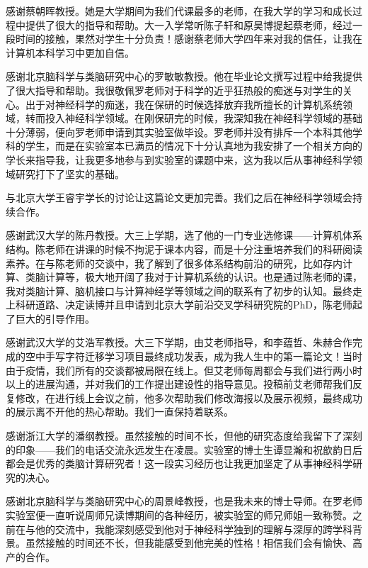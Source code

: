 
\begin{acknowledgements}
  感谢蔡朝晖教授。她是大学期间为我们代课最多的老师，在我大学的学习和成长过程中提供了很大的指导和帮助。大一入学常听陈子轩和原昊博提起蔡老师，经过一段时间的接触，果然对学生十分负责！感谢蔡老师大学四年来对我的信任，让我在计算机本科学习中更加自信。

  感谢北京脑科学与类脑研究中心的罗敏敏教授。他在毕业论文撰写过程中给我提供了很大指导和帮助。我很敬佩罗老师对于科学的近乎狂热般的痴迷与对学生的关心。出于对神经科学的痴迷，我在保研的时候选择放弃我所擅长的计算机系统领域，转而投入神经科学领域。在刚保研完的时候，我深知我在神经科学领域的基础十分薄弱，便向罗老师申请到其实验室做毕设。罗老师并没有排斥一个本科其他学科的学生，而是在实验室本已满员的情况下十分认真地为我安排了一个相关方向的学长来指导我，让我更多地参与到实验室的课题中来，这为我以后从事神经科学领域研究打下了坚实的基础。

  与北京大学王睿宇学长的讨论让这篇论文更加完善。我们之后在神经科学领域会持续合作。

  感谢武汉大学的陈丹教授。大三上学期，选了他的一门专业选修课——计算机体系结构。陈老师在讲课的时候不拘泥于课本内容，而是十分注重培养我们的科研阅读素养。在与陈老师的交谈中，我了解到了很多体系结构前沿的研究，比如存内计算、类脑计算等，极大地开阔了我对于计算机系统的认识。也是通过陈老师的课，我对类脑计算、脑机接口与计算神经学等领域之间的联系有了初步的认知。最终走上科研道路、决定读博并且申请到北京大学前沿交叉学科研究院的PhD，陈老师起了巨大的引导作用。

  感谢武汉大学的艾浩军教授。大三下学期，由艾老师指导，和李蕴哲、朱赫合作完成的空中手写字符迁移学习项目最终成功发表，成为我人生中的第一篇论文！当时由于疫情，我们所有的交谈都被局限在线上。但艾老师每周都会与我们进行两小时以上的进展沟通，并对我们的工作提出建设性的指导意见。投稿前艾老师帮我们反复修改，在进行线上会议之前，他多次帮助我们修改海报以及展示视频，最终成功的展示离不开他的热心帮助。我们一直保持着联系。

  感谢浙江大学的潘纲教授。虽然接触的时间不长，但他的研究态度给我留下了深刻的印象——我们的电话交流永远发生在凌晨。实验室的博士生谭显瀚和祝歆韵日后都会是优秀的类脑计算研究者！这一段实习经历也让我更加坚定了从事神经科学研究的决心。

  感谢北京脑科学与类脑研究中心的周景峰教授，也是我未来的博士导师。在罗老师实验室便一直听说周师兄读博期间的各种经历，被实验室的师兄师姐一致称赞。之前在与他的交流中，我能深刻感受到他对于神经科学独到的理解与深厚的跨学科背景。虽然接触的时间还不长，但我能感受到他完美的性格！相信我们会有愉快、高产的合作。


\end{acknowledgements}
